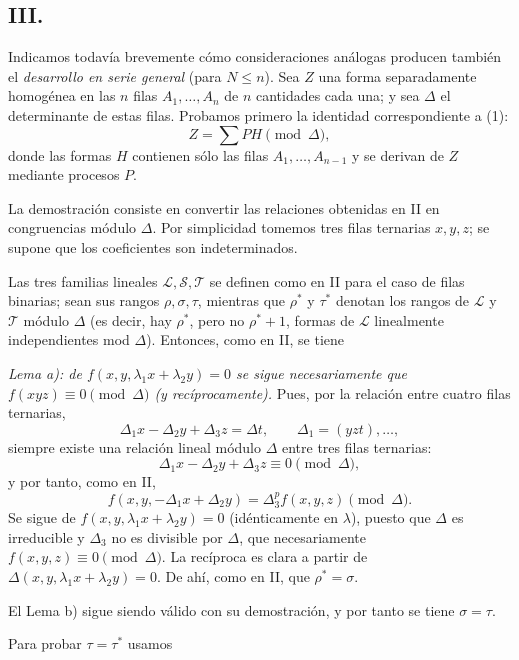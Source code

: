 \documentclass[11pt]{article}
\begin{document}
\subsection*{III.}
Indicamos todavía brevemente cómo consideraciones análogas producen también el \emph{desarrollo en serie general} (para $N\le n$). Sea $Z$ una forma separadamente homogénea en las $n$ filas $A_1,
\ldots,A_n$ de $n$ cantidades cada una; y sea $\Delta$ el determinante de estas filas. Probamos primero la identidad correspondiente a (1):
\begin{equation}
  Z=\sum PH \pmod{\Delta},
\tag{2}
\end{equation}
donde las formas $H$ contienen sólo las filas $A_1,
\ldots,A_{n-1}$ y se derivan de $Z$ mediante procesos $P$.

La demostración consiste en convertir las relaciones obtenidas en II en congruencias módulo $\Delta$. Por simplicidad tomemos tres filas ternarias $x,y,z$; se supone que los coeficientes son indeterminados.

Las tres familias lineales $\mathcal L,\mathcal S,\mathcal T$ se definen como en II para el caso de filas binarias; sean sus rangos $\rho,\sigma,\tau$, mientras que $\rho^*$ y $\tau^*$ denotan los rangos de $\mathcal L$ y $\mathcal T$ módulo $\Delta$ (es decir, hay $\rho^*$, pero no $\rho^*+1$, formas de $\mathcal L$ linealmente independientes mod $\Delta$). Entonces, como en II, se tiene

\emph{Lema a): de $f(x,y,\lambda_1x+\lambda_2y)=0$ se sigue necesariamente que $f(xyz)\equiv0\pmod{\Delta}$ (y recíprocamente).} Pues, por la relación entre cuatro filas ternarias,
\[
  \Delta_1x-\Delta_2y+\Delta_3z=\Delta t,
  \qquad \Delta_1=(yzt),\ldots,
\]
siempre existe una relación lineal módulo $\Delta$ entre tres filas ternarias:
\[
  \Delta_1x-\Delta_2y+\Delta_3z\equiv0\pmod{\Delta},
\]
y por tanto, como en II,
\[
  f(x,y,-\Delta_1x+\Delta_2y)=\Delta_3^p f(x,y,z)\pmod{\Delta}.
\]
Se sigue de $f(x,y,\lambda_1x+\lambda_2y)=0$ (idénticamente en $\lambda$), puesto que $\Delta$ es irreducible y $\Delta_3$ no es divisible por $\Delta$, que necesariamente $f(x,y,z)\equiv0\pmod{\Delta}$. La recíproca es clara a partir de $\Delta(x,y,\lambda_1x+\lambda_2y)=0$. De ahí, como en II, que $\rho^*=\sigma$.

El Lema b) sigue siendo válido con su demostración, y por tanto se tiene $\sigma=\tau$.

Para probar $\tau=\tau^*$ usamos
\end{document}
